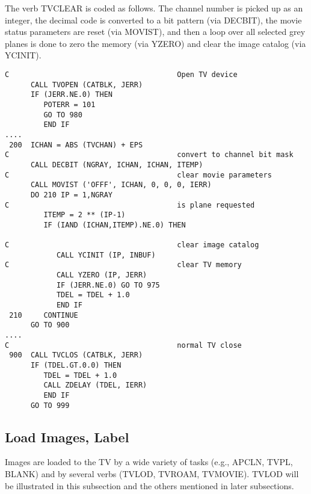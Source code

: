 The verb TVCLEAR is coded as follows.  The channel number is picked up
as an integer, the decimal code is converted to a bit pattern (via
DECBIT), the movie status parameters are reset (via MOVIST), and then
a loop over all selected grey planes is done to zero the memory (via
YZERO) and clear the image catalog (via YCINIT).

\begin{verbatim}
C                                       Open TV device
      CALL TVOPEN (CATBLK, JERR)
      IF (JERR.NE.0) THEN
         POTERR = 101
         GO TO 980
         END IF
....
 200  ICHAN = ABS (TVCHAN) + EPS
C                                       convert to channel bit mask
      CALL DECBIT (NGRAY, ICHAN, ICHAN, ITEMP)
C                                       clear movie parameters
      CALL MOVIST ('OFFF', ICHAN, 0, 0, 0, IERR)
      DO 210 IP = 1,NGRAY
C                                       is plane requested
         ITEMP = 2 ** (IP-1)
         IF (IAND (ICHAN,ITEMP).NE.0) THEN

C                                       clear image catalog
            CALL YCINIT (IP, INBUF)
C                                       clear TV memory
            CALL YZERO (IP, JERR)
            IF (JERR.NE.0) GO TO 975
            TDEL = TDEL + 1.0
            END IF
 210     CONTINUE
      GO TO 900
....
C                                       normal TV close
 900  CALL TVCLOS (CATBLK, JERR)
      IF (TDEL.GT.0.0) THEN
         TDEL = TDEL + 1.0
         CALL ZDELAY (TDEL, IERR)
         END IF
      GO TO 999

\end{verbatim}

\subsection{Load Images, Label}
Images are loaded to the TV by a wide variety of tasks (e.g., APCLN,
TVPL, BLANK) and by several verbs (TVLOD, TVROAM, TVMOVIE). TVLOD will
be illustrated in this subsection and the others mentioned in later
subsections.

